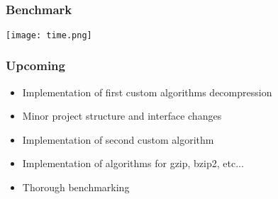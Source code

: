 \documentclass[compress]{beamer}
\begin{document}
\subsection*{}

\begin{frame}
	\frametitle{Benchmark}
	\begin{center}
		\texttt{[image: time.png]}
	\end{center}
\end{frame}

\begin{frame}
	\frametitle{Upcoming}

	\begin{itemize}
		\item Implementation of first custom algorithms decompression
		\item Minor project structure and interface changes
		\item Implementation of second custom algorithm
		\item Implementation of algorithms for gzip, bzip2, etc...
		\item Thorough benchmarking
	\end{itemize}

\end{frame}
\end{document}
